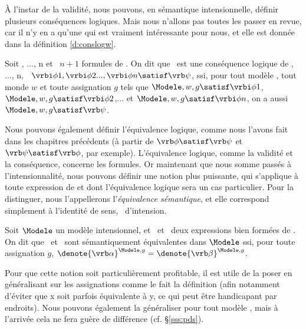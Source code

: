 \smallskip

À l'instar de la validité, nous pouvons, en sémantique intensionnelle, définir plusieurs conséquences logiques.
Mais nous n'allons pas toutes les passer en revue, car il n'y en a qu'une qui est vraiment intéressante pour nous, et elle est donnée dans la définition \ref{d:conslogw}.


\begin{defi}\label{d:conslogw}%
Soit \vrbi{}, \vrbi{}..., \vrbi\phi n et \vrb\psi\ $n+1$ formules de {\LO}. 
On dit que \vrb\psi\ est une conséquence logique de \vrbi{}, \vrbi{}..., \vrbi\phi n, \ie\ \(\vrbi\phi1, \vrbi\phi2..., \vrbi\phi n \satisf \vrb\psi\), ssi, pour tout modèle \Modele, tout monde $w$ et toute assignation $g$ tels que 
$\Modele,w,g\satisf\vrbi\phi1$,  
$\Modele,w,g\satisf\vrbi\phi2$,... et 
$\Modele,w,g\satisf\vrbi\phi n$,
on a aussi $\Modele,w,g\satisf\vrb\psi$.  
\end{defi}


Nous pouvons également définir l'équivalence logique,
comme nous l'avons fait dans les chapitres précédents (à partir de $\vrb\phi\satisf\vrb\psi$ et $\vrb\psi\satisf\vrb\phi$, par exemple).  L'équivalence logique, comme la validité et la conséquence, concerne les formules. 
Or maintenant que nous somme passés à l'intensionnalité, nous pouvons définir une notion plus puissante, qui s'applique à toute expression de {\LO} et dont l'équivalence logique sera un cas particulier. Pour la distinguer, nous l'appellerons l'\emph{équivalence sémantique}, et elle correspond simplement à l'identité de sens, \ie\ d'intension.

\begin{defi}\label{d:eqsemw}
Soit $\Modele$ un modèle intensionnel, et \vrb\alpha\ et \vrb\beta\ deux expressions bien formées de {\LO}.  On dit que \vrb\alpha\ et \vrb\beta\ sont sémantiquement équivalentes dans $\Modele$ ssi, pour toute assignation $g$, \(\denote{\vrb\alpha}^{\Modele,g}=\denote{\vrb\beta}^{\Modele,g}\).
\end{defi}

Pour que cette notion soit particulièrement profitable, il est utile de la poser en généralisant sur les assignations comme le fait la définition (afin notamment d'éviter que \vrb x soit parfois équivalente à \vrb y, ce qui peut être handicapant par endroits). 
Nous pouvons également la généraliser pour tout modèle \Modele, mais à l'arrivée cela ne fera guère de différence (cf. \S\ref{sss:pds}). 

